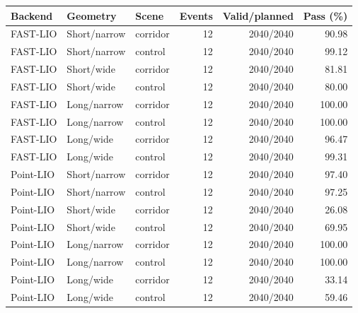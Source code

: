 \begin{tabular}{@{}lllrrr@{}}
\toprule
Backend & Geometry & Scene & Events & Valid/planned & Pass (\%)\\\midrule
FAST-LIO & Short/narrow & corridor & 12 & 2040/2040 & 90.98\\
FAST-LIO & Short/narrow & control & 12 & 2040/2040 & 99.12\\
FAST-LIO & Short/wide & corridor & 12 & 2040/2040 & 81.81\\
FAST-LIO & Short/wide & control & 12 & 2040/2040 & 80.00\\
FAST-LIO & Long/narrow & corridor & 12 & 2040/2040 & 100.00\\
FAST-LIO & Long/narrow & control & 12 & 2040/2040 & 100.00\\
FAST-LIO & Long/wide & corridor & 12 & 2040/2040 & 96.47\\
FAST-LIO & Long/wide & control & 12 & 2040/2040 & 99.31\\
Point-LIO & Short/narrow & corridor & 12 & 2040/2040 & 97.40\\
Point-LIO & Short/narrow & control & 12 & 2040/2040 & 97.25\\
Point-LIO & Short/wide & corridor & 12 & 2040/2040 & 26.08\\
Point-LIO & Short/wide & control & 12 & 2040/2040 & 69.95\\
Point-LIO & Long/narrow & corridor & 12 & 2040/2040 & 100.00\\
Point-LIO & Long/narrow & control & 12 & 2040/2040 & 100.00\\
Point-LIO & Long/wide & corridor & 12 & 2040/2040 & 33.14\\
Point-LIO & Long/wide & control & 12 & 2040/2040 & 59.46\\
\bottomrule
\end{tabular}
